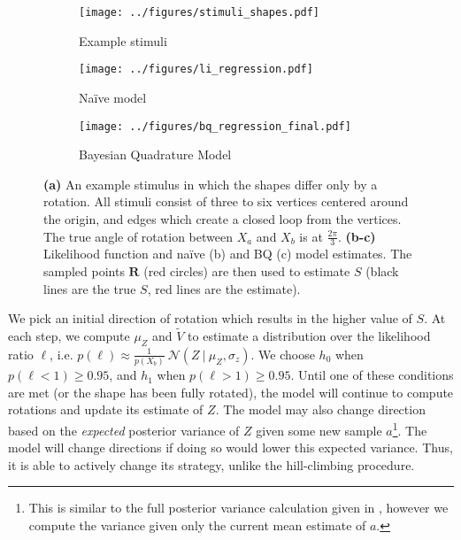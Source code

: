 \documentclass{article} %
\newcommand{\naive}[0]{na\"ive}
\newcommand{\Naive}[0]{Na\"ive}
\begin{document}
\begin{figure}[t]
  \centering
  \begin{subfigure}[b]{0.32\textwidth}
    \centering
    \texttt{[image: ../figures/stimuli\_shapes.pdf]}
    \vspace{0pt}
    \caption{Example stimuli}
    \label{fig:stimuli}
  \end{subfigure}
  \begin{subfigure}[b]{0.32\textwidth}
    \centering
    \texttt{[image: ../figures/li\_regression.pdf]}
    \caption{\Naive{} model}
    \label{fig:li}
  \end{subfigure}
  \begin{subfigure}[b]{0.32\textwidth}
    \centering
    \texttt{[image: ../figures/bq\_regression\_final.pdf]}
    \caption{Bayesian Quadrature Model}
    \vspace{0pt}
    \label{fig:bq}
  \end{subfigure}
  \caption{\textbf{(a)} An example stimulus in which the shapes differ
    only by a rotation. All stimuli consist of three to six vertices
    centered around the origin, and edges which create a closed loop
    from the vertices. The true angle of rotation between $X_a$ and
    $X_b$ is at $\frac{2\pi}{3}$. \textbf{(b-c)} Likelihood function
    and \naive{} (b) and BQ (c) model estimates. The sampled points
    $\mathbf{R}$ (red circles) are then used to estimate $S$ (black
    lines are the true $S$, red lines are the estimate).}
  \label{fig:shapes}
\end{figure}

We pick an initial direction of rotation which results in the higher
value of $S$. At each step, we compute $\mu_Z$ and $\tilde{V}$ to
estimate a distribution over the likelihood ratio $\ell$, i.e.
$p(\ell)\approx\frac{1}{p(X_b)}\ \mathcal{N}(Z\ \vert\ \mu_Z,
\sigma_z)$.  We choose $h_0$ when $p(\ell < 1)\geq 0.95$, and $h_1$
when $p(\ell > 1)\geq 0.95$. Until one of these conditions are met (or
the shape has been fully rotated), the model will continue to compute
rotations and update its estimate of $Z$.  The model may also change
direction based on the \textit{expected} posterior variance of $Z$
given some new sample $a$\footnote{This is similar to the full
  posterior variance calculation given in \cite{Osborne:2012tm},
  however we compute the variance given only the current mean estimate
  of $a$.}. The model will change directions if doing so would lower
this expected variance. Thus, it is able to actively change its
strategy, unlike the hill-climbing procedure.
\end{document}
